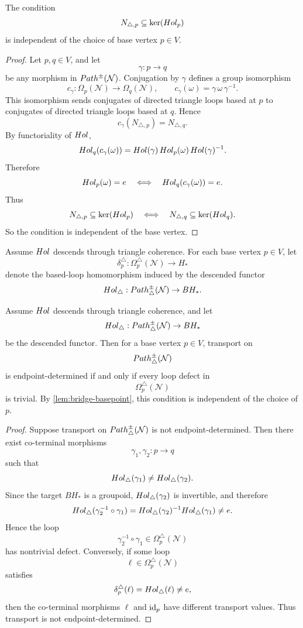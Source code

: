 \begin{lemma}
	\label{lem:bridge-basepoint}
	The condition
	\[
		N_{\triangle,p}\subseteq \ker(Hol_p)
	\]
	is independent of the choice of base vertex \(p\in V\).
\end{lemma}
\begin{proof}
	Let \(p,q\in V\), and let
	\[
		\gamma:p\to q
	\]
	be any morphism in \(Path^\pm(\mathcal N)\). Conjugation by \(\gamma\)
	defines a group isomorphism
	\[
		c_\gamma:\Omega_p(\mathcal N)\to \Omega_q(\mathcal N),
		\qquad
		c_\gamma(\omega)=\gamma\,\omega\,\gamma^{-1}.
	\]
	This isomorphism sends conjugates of directed triangle loops based at
	\(p\) to conjugates of directed triangle loops based at \(q\). Hence
	\[
		c_\gamma(N_{\triangle,p})=N_{\triangle,q}.
	\]
	By functoriality of \(Hol\),
	\[
		Hol_q(c_\gamma(\omega))
		=
		Hol(\gamma)\,Hol_p(\omega)\,Hol(\gamma)^{-1}.
	\]
	Therefore
	\[
		Hol_p(\omega)=e
		\quad\Longleftrightarrow\quad
		Hol_q(c_\gamma(\omega))=e.
	\]
	Thus
	\[
		N_{\triangle,p}\subseteq \ker(Hol_p)
		\quad\Longleftrightarrow\quad
		N_{\triangle,q}\subseteq \ker(Hol_q).
	\]
	So the condition is independent of the base vertex.
\end{proof}
\begin{definition}
	Assume \(Hol\) descends through triangle coherence. For each base
	vertex \(p\in V\), let
	\[
		\delta_p^\triangle:\Omega_p^\triangle(\mathcal N)\to H_*
	\]
	denote the based-loop homomorphism induced by the descended functor
	\[
		Hol_\triangle:Path^\pm_\triangle(\mathcal N)\to BH_*.
	\]
\end{definition}
\begin{theorem}
	\label{thm:bridge-route}
	Assume \(Hol\) descends through triangle coherence, and let
	\[
		Hol_\triangle:Path^\pm_\triangle(\mathcal N)\to BH_*
	\]
	be the descended functor. Then for a base vertex \(p\in V\), transport
	on
	\[
		Path^\pm_\triangle(\mathcal N)
	\]
	is endpoint-determined if and only if every loop defect in
	\[
		\Omega_p^\triangle(\mathcal N)
	\]
	is trivial.
	By \cref{lem:bridge-basepoint}, this condition is independent of the
	choice of \(p\).
\end{theorem}
\begin{proof}
	Suppose transport on \(Path^\pm_\triangle(\mathcal N)\) is not
	endpoint-determined. Then there exist co-terminal morphisms
	\[
		\gamma_1,\gamma_2:p\to q
	\]
	such that
	\[
		Hol_\triangle(\gamma_1)\neq Hol_\triangle(\gamma_2).
	\]
	Since the target \(BH_*\) is a groupoid, \(Hol_\triangle(\gamma_2)\) is
	invertible, and therefore
	\[
		Hol_\triangle(\gamma_2^{-1}\circ\gamma_1)
		=
		Hol_\triangle(\gamma_2)^{-1}Hol_\triangle(\gamma_1)\neq e.
	\]
	Hence the loop
	\[
		\gamma_2^{-1}\circ\gamma_1\in \Omega_p^\triangle(\mathcal N)
	\]
	has nontrivial defect.
	Conversely, if some loop
	\[
		\ell\in \Omega_p^\triangle(\mathcal N)
	\]
	satisfies
	\[
		\delta_p^\triangle(\ell)=Hol_\triangle(\ell)\neq e,
	\]
	then the co-terminal morphisms \(\ell\) and \(\operatorname{id}_p\) have different
	transport values. Thus transport is not endpoint-determined.
\end{proof}
